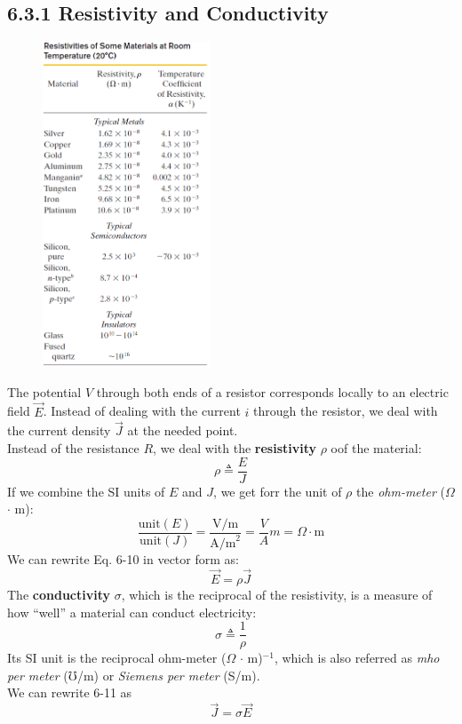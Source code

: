 \documentclass[12pt, a4paper]{article}
\begin{document}
		
		
		\subsection*{6.3.1 Resistivity and Conductivity}
		
		\begin{figure}
			\centering
			\includegraphics[width=5cm]{Physics2_PNGs/resistivities-table.png}
			\caption*{}
			\label{fig:resistivities-table.png}
		\end{figure}
		The potential $V$ through both ends of a resistor corresponds locally to an electric field $\vec{E}$. Instead of dealing with the current $i$ through the resistor, we deal with the current density $\vec{J}$ at the needed point. \\
		Instead of the resistance $R$, we deal with the \textbf{resistivity} $\rho$ oof the material:
		\[
			\rho \triangleq \frac{E}{J}
			\tag{Definition of Resistivity, 6-10}
		\]
		If we combine the SI units of $E$ and $J$, we get forr the unit of $\rho$ the \textit{ohm-meter} ($\Omega$ $\cdot$ m):
		\[
			\frac{\text{unit}(E)}{\text{unit}(J)} = \frac{\text{V/m}}{\text{A/m}^2}
			 = \frac{V}{A} m = \Omega \cdot \text{m}
		\]
		We can rewrite Eq. 6-10 in vector form as:
		\[
			\vec{E} = \rho \vec{J}
			\tag{Ohm's Law, 6-11}
		\]
		The \textbf{conductivity} $\sigma$, which is the reciprocal of the resistivity, is a measure of how ``well'' a material can conduct electricity:
		\[
			\sigma \triangleq \frac{1}{\rho}
			\tag{Definition of Conductivity, 6-12}
		\]
		Its SI unit is the reciprocal ohm-meter ($\Omega$ $\cdot$ m)$^{-1}$, which is also referred as \textit{mho per meter} ($\mho$/m) or \textit{Siemens per meter} (S/m). \\
		We can rewrite 6-11 as
		\[
			\vec{J} = \sigma \vec{E}
			\tag{6-13}
		\]
		
\end{document}
